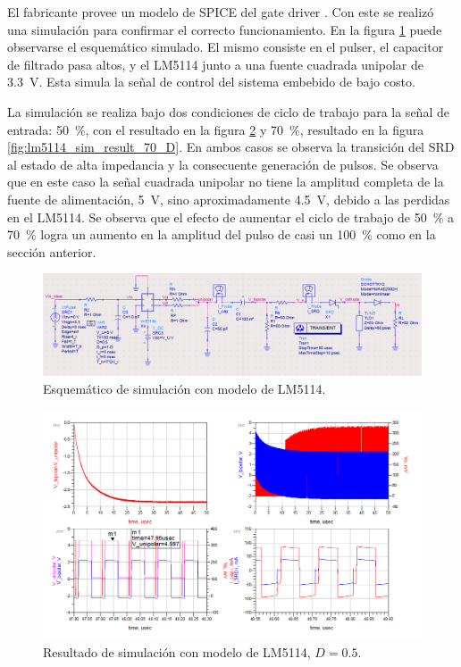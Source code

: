 El fabricante provee un modelo de SPICE del gate driver \cite{LM5114-PSpice}.
Con este se realizó una simulación para confirmar el correcto funcionamiento. En
la figura \ref{fig:lm5114_sim_sch} puede observarse el esquemático simulado. El
mismo consiste en el pulser, el capacitor de filtrado pasa altos, y el LM5114
junto a una fuente cuadrada unipolar de \qty{3.3}{\volt}. Esta simula la señal
de control del sistema embebido de bajo costo.

La simulación se realiza bajo dos condiciones de ciclo de trabajo para la señal
de entrada: \qty{50}{\percent}, con el resultado en la figura
\ref{fig:lm5114_sim_result_50_D} y \qty{70}{\percent}, resultado en la figura
\ref{fig:lm5114_sim_result_70_D}. En ambos casos se observa la transición del
SRD al estado de alta impedancia y la consecuente generación de pulsos. Se
observa que en este caso la señal cuadrada unipolar no tiene la amplitud
completa de la fuente de alimentación, \qty{5}{\volt}, sino aproximadamente
\qty{4.5}{\volt}, debido a las perdidas en el LM5114. Se observa que el efecto
de aumentar el ciclo de trabajo de \qty{50}{\percent} a \qty{70}{\percent} logra
un aumento en la amplitud del pulso de casi un \qty{100}{\percent} como en la
sección anterior.

\begin{figure}[tbp]
    \centering
    \includegraphics[width=\textwidth]{images/lm5114_sim_sch.png}
    \caption{Esquemático de simulación con modelo de LM5114.}
    \label{fig:lm5114_sim_sch}
\end{figure}

\begin{figure}[tbp]
    \centering
    \includegraphics[width=\textwidth]{images/lm5114_sim_result_50_D.png}
    \caption{Resultado de simulación con modelo de LM5114, $D=0.5$.}
    \label{fig:lm5114_sim_result_50_D}
\end{figure}

